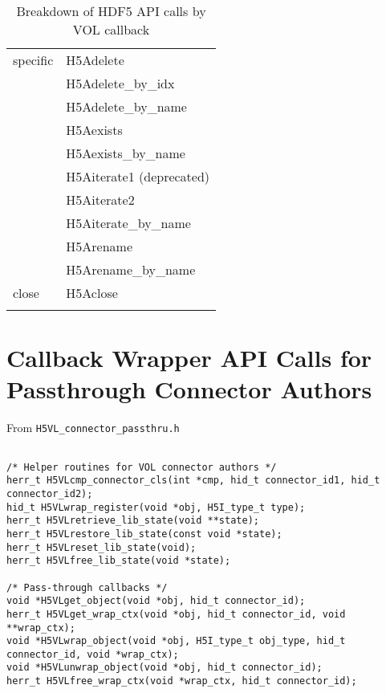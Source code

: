 \begin{appendices}
\begin{longtable}{ |l|>{\raggedright\arraybackslash}l| }
    \hline
    specific & H5Adelete \\
             & H5Adelete\_by\_idx \\
             & H5Adelete\_by\_name \\
             & H5Aexists \\
             & H5Aexists\_by\_name \\
             & H5Aiterate1 (deprecated) \\
             & H5Aiterate2 \\
             & H5Aiterate\_by\_name \\
             & H5Arename \\
             & H5Arename\_by\_name \\
    \hline
    close & H5Aclose \\
    \hline
\caption{Breakdown of HDF5 API calls by VOL callback}
\end{longtable}

\pagebreak

\section{Callback Wrapper API Calls for Passthrough Connector Authors}
\label{sec:B}

From {\tt H5VL\_connector\_passthru.h}

\begin{lstlisting}

/* Helper routines for VOL connector authors */                                  
herr_t H5VLcmp_connector_cls(int *cmp, hid_t connector_id1, hid_t connector_id2);
hid_t H5VLwrap_register(void *obj, H5I_type_t type);                      
herr_t H5VLretrieve_lib_state(void **state);                              
herr_t H5VLrestore_lib_state(const void *state);                          
herr_t H5VLreset_lib_state(void);                                         
herr_t H5VLfree_lib_state(void *state);                                   
                                                                                 
/* Pass-through callbacks */                                                     
void *H5VLget_object(void *obj, hid_t connector_id);                      
herr_t H5VLget_wrap_ctx(void *obj, hid_t connector_id, void **wrap_ctx);  
void *H5VLwrap_object(void *obj, H5I_type_t obj_type, hid_t connector_id, void *wrap_ctx);                                                             
void *H5VLunwrap_object(void *obj, hid_t connector_id);                   
herr_t H5VLfree_wrap_ctx(void *wrap_ctx, hid_t connector_id);             
                                                                                 

\end{lstlisting}
\end{appendices}
